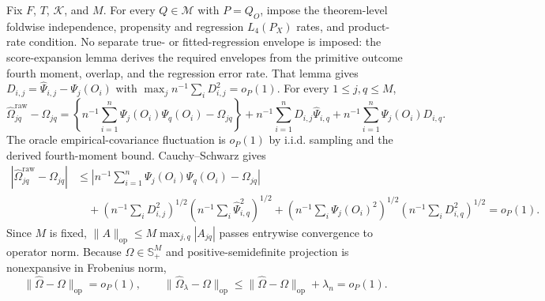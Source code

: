 Fix \(F\), \(T\), \(\mathcal K\), and \(M\). For every \(Q\in\mathcal M\) with \(P=Q_O\), impose the theorem-level foldwise independence, propensity and regression \(L_4(P_X)\) rates, and product-rate condition. No separate true- or fitted-regression envelope is imposed: the score-expansion lemma derives the required envelopes from the primitive outcome fourth moment, overlap, and the regression error rate. That lemma gives \(D_{i,j}=\widehat\Psi_{i,j}-\Psi_j(O_i)\) with \(\max_j n^{-1}\sum_iD_{i,j}^2=o_P(1)\). For every \(1\le j,q\le M\), \[\widehat\Omega^{\mathrm{raw}}_{jq}-\Omega_{jq}=\left\{n^{-1}\sum_{i=1}^n\Psi_j(O_i)\Psi_q(O_i)-\Omega_{jq}\right\}+n^{-1}\sum_{i=1}^nD_{i,j}\widehat\Psi_{i,q}+n^{-1}\sum_{i=1}^n\Psi_j(O_i)D_{i,q}.\] The oracle empirical-covariance fluctuation is \(o_P(1)\) by i.i.d. sampling and the derived fourth-moment bound. Cauchy--Schwarz gives \[\begin{aligned}|\widehat\Omega^{\mathrm{raw}}_{jq}-\Omega_{jq}|&\le\left|n^{-1}\sum_{i=1}^n\Psi_j(O_i)\Psi_q(O_i)-\Omega_{jq}\right|\\&\quad+\left(n^{-1}\sum_iD_{i,j}^2\right)^{1/2}\left(n^{-1}\sum_i\widehat\Psi_{i,q}^2\right)^{1/2}+\left(n^{-1}\sum_i\Psi_j(O_i)^2\right)^{1/2}\left(n^{-1}\sum_iD_{i,q}^2\right)^{1/2}=o_P(1).\end{aligned}\] Since \(M\) is fixed, \(\|A\|_{\mathrm{op}}\le M\max_{j,q}|A_{jq}|\) passes entrywise convergence to operator norm. Because \(\Omega\in\mathbb S_+^M\) and positive-semidefinite projection is nonexpansive in Frobenius norm, \[\|\widehat\Omega-\Omega\|_{\mathrm{op}}=o_P(1),\qquad \|\widehat\Omega_\lambda-\Omega\|_{\mathrm{op}}\le\|\widehat\Omega-\Omega\|_{\mathrm{op}}+\lambda_n=o_P(1).\]